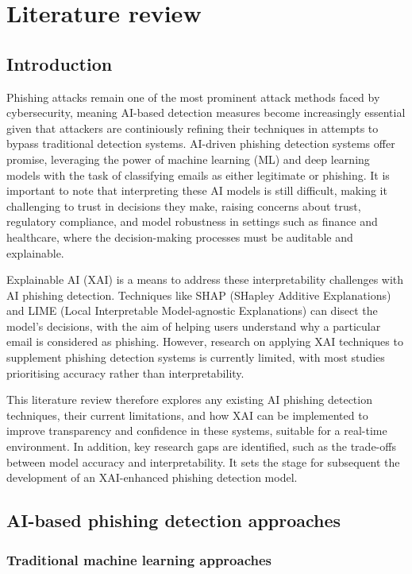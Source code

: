 \section{Literature review}

\subsection*{Introduction}
Phishing attacks remain one of the most prominent attack methods faced by cybersecurity, meaning AI-based detection measures become increasingly essential given that attackers are continiously refining their techniques in attempts to bypass traditional detection systems. AI-driven phishing detection systems offer promise, leveraging the power of machine learning (ML) and deep learning models with the task of classifying emails as either legitimate or phishing. It is important to note that interpreting these AI models is still difficult, making it challenging to trust in decisions they make, raising concerns about trust, regulatory compliance, and model robustness in settings such as finance and healthcare, where the decision-making processes must be auditable and explainable.

\noindent Explainable AI (XAI) is a means to address these interpretability challenges with AI phishing detection. Techniques like SHAP (SHapley Additive Explanations) and LIME (Local Interpretable Model-agnostic Explanations) can disect the model's decisions, with the aim of helping users understand why a particular email is considered as phishing. However, research on applying XAI techniques to supplement phishing detection systems is currently limited, with most studies prioritising accuracy rather than interpretability.

\noindent This literature review therefore explores any existing AI phishing detection techniques, their current limitations, and how XAI can be implemented to improve transparency and confidence in these systems, suitable for a real-time environment. In addition, key research gaps are identified, such as the trade-offs between model accuracy and interpretability. It sets the stage for subsequent the development of an XAI-enhanced phishing detection model.

\subsection*{AI-based phishing detection approaches}

\subsubsection*{Traditional machine learning approaches}


